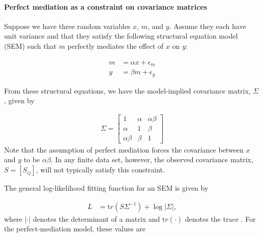 \documentclass[
]{article}
\begin{document}
\paragraph{Perfect mediation as a constraint on covariance
matrices}\label{perfect-mediation-as-a-constraint-on-covariance-matrices}

Suppose we have three random variables \(x\), \(m\), and \(y\). Assume
they each have unit variance and that they satisfy the following
structural equation model (SEM) such that \(m\) perfectly mediates the
effect of \(x\) on \(y\):

\begin{align}
m &= \alpha x + \epsilon_m \label{eqn:perfect_mediation1}\\ 
y &= \beta m + \epsilon_y  \label{eqn:perfect_mediation2}
\end{align}

From these structural equations, we have the model-implied covariance
matrix, \(\Sigma\), given by

\begin{align}
\label{eqn:model_implied_covariance}
\Sigma = 
  \begin{bmatrix}
1 & \alpha & \alpha \beta \\
\alpha & 1 & \beta \\
\alpha \beta & \beta & 1
\end{bmatrix}
\end{align} Note that the assumption of perfect mediation forces the
covariance between \(x\) and \(y\) to be \(\alpha \beta\). In any finite
data set, however, the observed covariance matrix, \(S = [S_{ij}]\),
will not typically satisfy this constraint.

The general log-likelihood fitting function for an SEM is given by

\begin{align}
\label{eq:loglikelihood}
L &= {\mathrm tr}\left(S \Sigma^{-1}\right) + \log\left|\Sigma\right|,
\end{align} where \(|\cdot|\) denotes the determinant of a matrix and
\({\mathrm tr}(\cdot)\) denotes the trace \cite{bollen2014structural}.
For the perfect-mediation model, these values are
\end{document}
